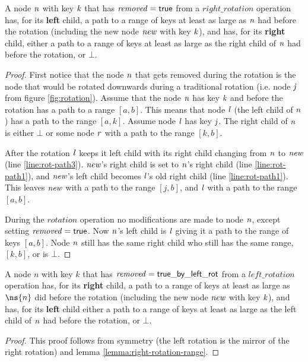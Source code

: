 \begin{lemma}
\label{lemma:right-rotation-range}
A node $\ms{n}$ with key $\ms{k}$ that has $\ms{removed}=\lit{true}$ from a $right\_rotation$ operation has, for its \textbf{left} child,
a path to a range of keys at least as large as 
$\ms{n}$ had before the rotation (including the new node $\ms{new}$ with key $\ms{k}$), and has, for its \textbf{right} child,
either a path to a range of keys at least as large as the right child of $\ms{n}$ had before the rotation, or $\bot$.
\end{lemma}
\begin{proof}
First notice that the node $\ms{n}$ that gets removed during the rotation is the node that would
be rotated downwards during a traditional rotation (i.e. node $\ms{j}$ from figure \ref{fig:rotation}).
Assume that the node $\ms{n}$ has key $\ms{k}$ and before the rotation has a path to a range $[a, b]$.
This means that node $\ms{l}$ (the left child of $\ms{n}$) has a path to the range $[a, k]$.
Assume node $\ms{l}$ has key $\ms{j}$.
The right child of $\ms{n}$ is either $\bot$ or some node $\ms{r}$ with a path to the range $[k, b]$.

After the rotation $\ms{l}$ keeps it left child with its right child changing from $\ms{n}$ to $\ms{new}$ (line \ref{line:rot-path3}).
$\ms{new}$'s right child is set to $\ms{n}$'s right child (line \ref{line:rot-path1}), and $\ms{new}$'s left child becomes $\ms{l}$'s old right child (line \ref{line:rot-path1}).
This leaves $\ms{new}$ with a path to the range $[j, b]$, and $\ms{l}$ with a path to the range $[a, b]$.

During the $rotation$ operation no modifications are made to node $\ms{n}$, except setting $\ms{removed}=\lit{true}$.
Now $\ms{n}$'s left child is $\ms{l}$ giving it a path to the range of keys $[a, b]$.
Node $\ms{n}$ still has the same right child who still has the same range, $[k, b]$, or is $\bot$.
\end{proof}



\begin{lemma}
\label{lemma:left-rotation-range}
A node $n$ with key $k$ that has $\ms{removed}=\lit{true\_by\_left\_rot}$ from a $left\_rotation$ operation has,
for its \textbf{right} child, a path to a range of keys at least as large as
$\ns{n}$ did before the rotation (including the new node $\ms{new}$ with key $\ms{k}$), and has, for its \textbf{left} child
either a path to a range of keys at least as large as the left child of $\ms{n}$ had before the rotation, or $\bot$.
\end{lemma}
\begin{proof}
This proof follows from symmetry (the left rotation is the mirror of the right rotation) and lemma \ref{lemma:right-rotation-range}.
\end{proof}


